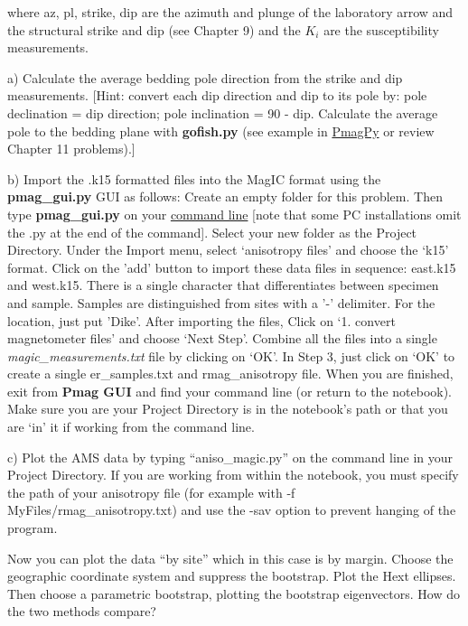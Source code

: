 {\noindent where az, pl, strike, dip are the azimuth and plunge of the laboratory arrow and the structural strike and dip (see Chapter 9) and the $K_i$ are the susceptibility measurements.  

a) Calculate the average bedding pole direction from the strike and dip measurements.  [Hint:  convert each dip direction and dip to its pole by: pole declination = dip direction; pole inclination = 90 - dip.
Calculate the average pole to the bedding plane with {\bf gofish.py} (see example in \href{http://earthref.org/PmagPy#gofish.py}{PmagPy} or review Chapter 11 problems).]  

b)  Import the .k15 formatted files into the MagIC format using the {\bf pmag\_gui.py} GUI as follows:  Create an empty folder for this problem.  Then type {\bf pmag\_gui.py} on your \href{http://earthref.org/PmagPy#command_line}{command  line} [note that some PC installations omit the .py at the end of the command].  Select your new folder as the Project Directory.    Under the  Import menu, select `anisotropy files' and choose the   `k15' format.  Click on the 'add' button to import these data files in sequence:  east.k15 and west.k15.  There is a single character that differentiates between specimen and sample.  Samples are distinguished from sites with a '-' delimiter.  For the location, just put 'Dike'.     After importing the files, Click on  `1. convert magnetometer files'  and choose `Next Step'.  Combine  all the files into a single {\it magic\_measurements.txt} file by clicking on `OK'.   In Step 3, just click on `OK' to create a single er\_samples.txt and rmag\_anisotropy file.   When you are finished, exit from {\bf Pmag GUI} and find your command line (or return to the notebook).  Make sure you are your Project Directory is in the notebook's path or that you are `in' it if working from the command line.  

c)   Plot the AMS data by typing ``aniso\_magic.py'' on the command line in your Project Directory. If you are working from within the notebook, you must specify the path of your anisotropy file (for example with -f MyFiles/rmag\_anisotropy.txt) and    use the -sav option to prevent hanging of the program. 

Now you can plot the data ``by site'' which in this case is by margin.  Choose the geographic coordinate system and  suppress the bootstrap.  Plot the Hext ellipses.  Then choose a parametric bootstrap, plotting the bootstrap eigenvectors.     How do the two methods compare?   


}
